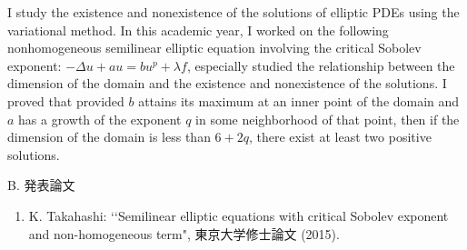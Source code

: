 \documentclass[a4j,twocolumn]{jarticle}
\begin{document}
\vspace{0.5cm}

I study the existence and nonexistence of the solutions
of elliptic PDEs using the variational method.
In this academic year, I worked on the following
nonhomogeneous semilinear elliptic equation
involving the critical Sobolev exponent:
$-\Delta u + a u = b u^p + \lambda f$, especially studied
the relationship between the dimension of the domain and
the existence and nonexistence of the solutions.
I proved that provided 
$b$ attains its maximum at an inner point of the
domain and $a$ has a growth of the exponent $q$
in some neighborhood of that point, then
if the dimension of the domain is less than $6 + 2q$,
there exist at least two positive solutions.

\vspace{0.2cm}


\noindent
B. 発表論文

\vspace{0.1cm}

\begin{enumerate}
\item K. Takahashi: \lq\lq Semilinear elliptic equations with critical
      Sobolev exponent and non-homogeneous term",
      東京大学修士論文 (2015).
\end{enumerate}
\end{document}
